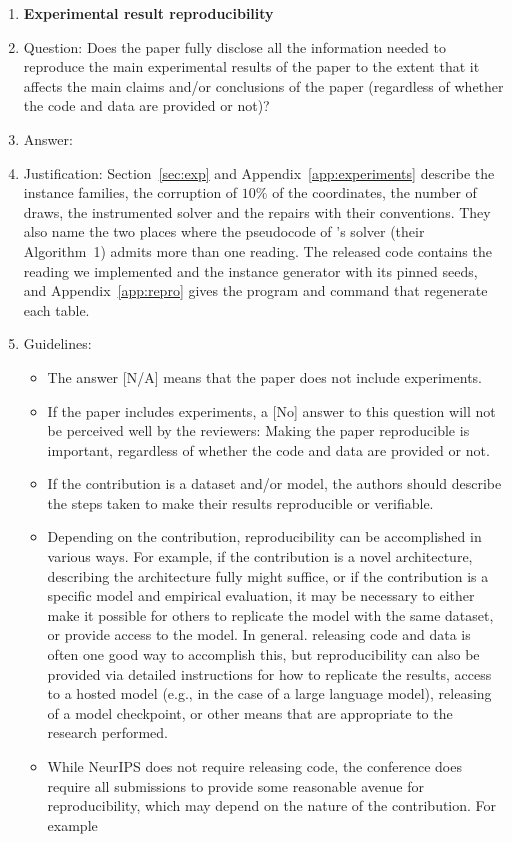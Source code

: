 \begin{enumerate}
\item {\bf Experimental result reproducibility}
    \item[] Question: Does the paper fully disclose all the information needed to reproduce the main experimental results of the paper to the extent that it affects the main claims and/or conclusions of the paper (regardless of whether the code and data are provided or not)?
    \item[] Answer: \answerYes{}
    \item[] Justification: Section~\ref{sec:exp} and Appendix~\ref{app:experiments} describe the instance families, the corruption of $10\%$ of the coordinates, the number of draws, the instrumented solver and the repairs with their conventions. They also name the two places where the pseudocode of \citeauthor{chen2022}'s solver (their Algorithm~1) admits more than one reading. The released code contains the reading we implemented and the instance generator with its pinned seeds, and Appendix~\ref{app:repro} gives the program and command that regenerate each table.
    \item[] Guidelines:
    \begin{itemize}
        \item The answer [N/A] means that the paper does not include experiments.
        \item If the paper includes experiments, a [No] answer to this question will not be perceived well by the reviewers: Making the paper reproducible is important, regardless of whether the code and data are provided or not.
        \item If the contribution is a dataset and/or model, the authors should describe the steps taken to make their results reproducible or verifiable.
        \item Depending on the contribution, reproducibility can be accomplished in various ways. For example, if the contribution is a novel architecture, describing the architecture fully might suffice, or if the contribution is a specific model and empirical evaluation, it may be necessary to either make it possible for others to replicate the model with the same dataset, or provide access to the model. In general. releasing code and data is often one good way to accomplish this, but reproducibility can also be provided via detailed instructions for how to replicate the results, access to a hosted model (e.g., in the case of a large language model), releasing of a model checkpoint, or other means that are appropriate to the research performed.
        \item While NeurIPS does not require releasing code, the conference does require all submissions to provide some reasonable avenue for reproducibility, which may depend on the nature of the contribution. For example

\end{itemize}
\end{enumerate}
